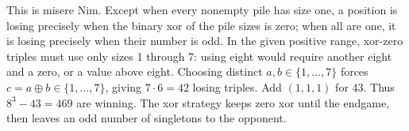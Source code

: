 This is misere Nim. Except when every nonempty pile has size one, a position is losing precisely when the binary xor of the pile sizes is zero; when all are one, it is losing precisely when their number is odd. In the given positive range, xor-zero triples must use only sizes 1 through 7: using eight would require another eight and a zero, or a value above eight. Choosing distinct $a,b\in\{1,\ldots,7\}$ forces $c=a\mathbin{\oplus}b\in\{1,\ldots,7\}$, giving $7\cdot6=42$ losing triples. Add $(1,1,1)$ for 43. Thus $8^3-43=\boxed{469}$ are winning. The xor strategy keeps zero xor until the endgame, then leaves an odd number of singletons to the opponent.
